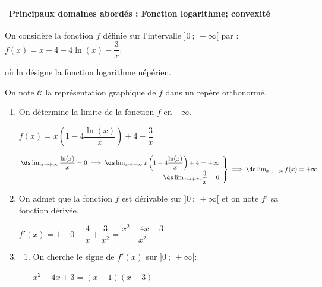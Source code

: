 \medskip

\begin{tabularx}{\linewidth}{|X|}\hline
\textbf{Principaux domaines abordés : Fonction logarithme; convexité}
\\ \hline
\end{tabularx}

\medskip

On considère la fonction $f$ définie sur l'intervalle $]0~;~ +\infty[$ par :
$f(x) = x + 4 - 4\ln (x) - \dfrac{3}{x}$,

où ln désigne la fonction logarithme népérien.

On note $\mathcal{C}$ la représentation graphique de $f$ dans un repère orthonormé.

\medskip

\begin{enumerate}
\item On détermine la limite de la fonction $f$ en $+\infty$.

$f(x) = x\left ( 1- 4\dfrac{\ln(x)}{x}\right ) + 4 -  \dfrac{3}{x}$

$\left.
\begin{array}{@{} r}
\ds\lim_{x\to +\infty} \dfrac{\ln(x)}{x} = 0 \implies \ds\lim_{x\to +\infty}  x\left ( 1- 4\dfrac{\ln(x)}{x}\right ) + 4 = +\infty\\
\ds\lim_{x\to +\infty} \dfrac{3}{x}= 0
\end{array}
\right \rbrace
\implies
\ds\lim_{x\to +\infty} f(x) = +\infty$

\item On admet que la fonction $f$ est dérivable sur $]0~;~ +\infty[$ et on note $f'$ sa fonction dérivée.


$f'(x)= 1 + 0 - \dfrac{4}{x} +\dfrac{3}{x^2} = \dfrac{x^2 - 4x +3}{x^2}$

\item
	\begin{enumerate}
		\item 
		



On cherche le signe de $f'(x)$ sur $]0~;~+\infty[$:

$x^2-4x+3 = (x-1)(x-3)$


\end{enumerate}
\end{enumerate}
